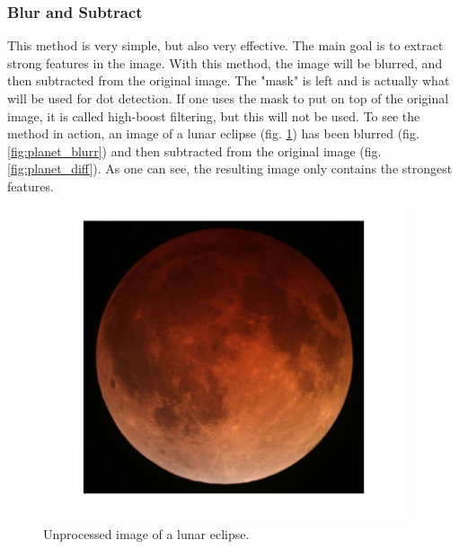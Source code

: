 \subsubsection{Blur and Subtract}
This method is very simple, but also very effective. The main goal is to extract strong features in the image. 
With this method, the image will be blurred, and then subtracted from the original image. The "mask" is left and is actually what will be used for dot detection. If one uses the mask to put on top of the original image, it is called high-boost filtering, but this will not be used. 
To see the method in action, an image of a lunar eclipse (fig. \ref{fig:planet}) has been blurred (fig. \ref{fig:planet_blurr}) and then subtracted from the original image (fig. \ref{fig:planet_diff}). As one can see, the resulting image only contains the strongest features.
\begin{figure}[h!]
    \centering
    \begin{minipage}[t]{0.3\textwidth}
        \centering
        \includegraphics[width=0.95\textwidth]{figures/ImageAnalysis/planet.png}
        \caption{Unprocessed image of a lunar eclipse.}
    \label{fig:planet}
    \end{minipage}%
    \hspace{.02\textwidth}
    \begin{minipage}[t]{0.3\textwidth}
        \centering

\end{minipage}
\end{figure}

